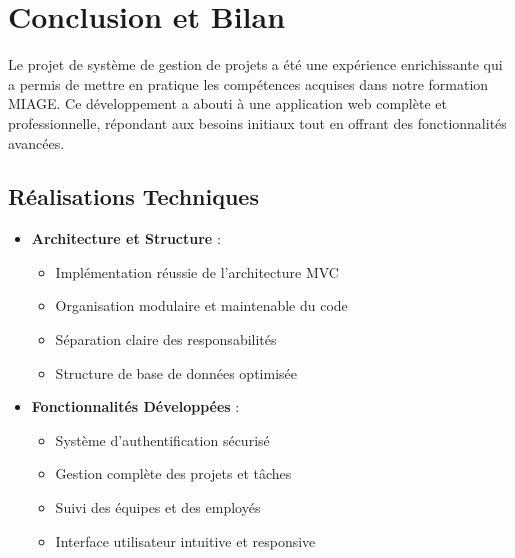 \documentclass[12pt,a4paper]{article}
\begin{document}
\section{Conclusion et Bilan}
Le projet de système de gestion de projets a été une expérience enrichissante qui a permis de mettre en pratique les compétences acquises dans notre formation MIAGE. Ce développement a abouti à une application web complète et professionnelle, répondant aux besoins initiaux tout en offrant des fonctionnalités avancées.

\subsection{Réalisations Techniques}
\begin{itemize}
    \item \textbf{Architecture et Structure} :
    \begin{itemize}
        \item Implémentation réussie de l'architecture MVC
        \item Organisation modulaire et maintenable du code
        \item Séparation claire des responsabilités
        \item Structure de base de données optimisée
    \end{itemize}

    \item \textbf{Fonctionnalités Développées} :
    \begin{itemize}
        \item Système d'authentification sécurisé
        \item Gestion complète des projets et tâches
        \item Suivi des équipes et des employés
        \item Interface utilisateur intuitive et responsive
    \end{itemize}
\end{itemize}
\end{document}
